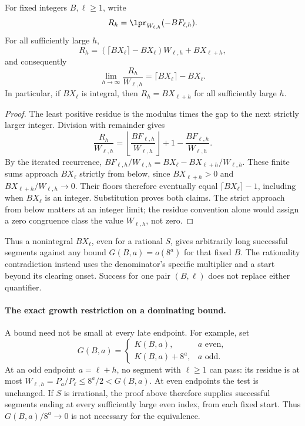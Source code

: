 \begin{proposition}
\label{long269:res:residue-limit}
For fixed integers $B,\ell\ge1$, write
\[
 R_h=\lpr_{W_{\ell,h}}(-BF_{\ell,h}).
\]
For all sufficiently large $h$,
\[
 R_h=(\lceil BX_\ell\rceil-BX_\ell)W_{\ell,h}+BX_{\ell+h},
\]
and consequently
\[
 \lim_{h\to\infty}\frac{R_h}{W_{\ell,h}}
 =\lceil BX_\ell\rceil-BX_\ell.
\]
In particular, if $BX_\ell$ is integral, then $R_h=BX_{\ell+h}$
for all sufficiently large $h$.
\end{proposition}
\begin{proof}
The least positive residue is the modulus times the gap to the next
strictly larger integer.  Division with remainder gives
\[
 \frac{R_h}{W_{\ell,h}}
 =\left\lfloor\frac{BF_{\ell,h}}{W_{\ell,h}}\right\rfloor+1
       -\frac{BF_{\ell,h}}{W_{\ell,h}}.
\]
By the iterated recurrence,
$BF_{\ell,h}/W_{\ell,h}=BX_\ell-BX_{\ell+h}/W_{\ell,h}$.
These finite sums approach $BX_\ell$ strictly from below, since
$BX_{\ell+h}>0$ and $BX_{\ell+h}/W_{\ell,h}\to0$.
Their floors therefore eventually equal $\lceil BX_\ell\rceil-1$,
including when $BX_\ell$ is an integer.  Substitution proves both claims.
The strict approach from below matters at an integer limit; the residue
convention alone would assign a zero congruence class the value
$W_{\ell,h}$, not zero.
\end{proof}
Thus a nonintegral $BX_\ell$, even for a rational $S$, gives arbitrarily
long successful segments against any bound $G(B,a)=o(8^a)$ for that fixed
$B$.  The rationality contradiction instead uses the denominator's
specific multiplier and a start beyond its clearing onset.  Success for
one pair $(B,\ell)$ does not replace either quantifier.

\paragraph{The exact growth restriction on a dominating bound.}
A bound need not be small at every late endpoint.  For example, set
\[
 G(B,a)=
 \begin{cases}
 K(B,a),&a\text{ even},\\
 K(B,a)+8^a,&a\text{ odd}.
 \end{cases}
\]
At an odd endpoint $a=\ell+h$, no segment with $\ell\ge1$ can pass:
its residue is at most $W_{\ell,h}=P_a/P_\ell\le8^a/2<G(B,a)$.
At even endpoints the test is unchanged.  If $S$ is irrational, the
proof above therefore supplies successful segments ending at every
sufficiently large even index, from each fixed start.  Thus
$G(B,a)/8^a\to0$ is not necessary for the equivalence.

